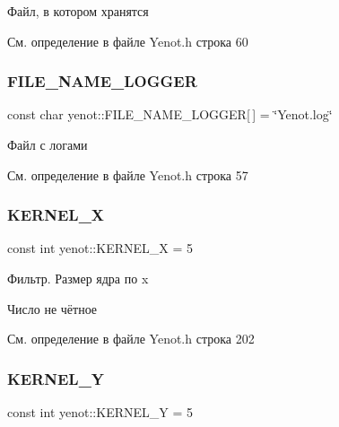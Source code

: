 Файл, в котором хранятся 



См. определение в файле Yenot.\+h строка 60

\mbox{\label{namespaceyenot_a6fdda6751433c679b7976669aff150b8}} 
\subsubsection{\texorpdfstring{F\+I\+L\+E\+\_\+\+N\+A\+M\+E\+\_\+\+L\+O\+G\+G\+ER}{FILE\_NAME\_LOGGER}}
{\footnotesize\ttfamily const char yenot\+::\+F\+I\+L\+E\+\_\+\+N\+A\+M\+E\+\_\+\+L\+O\+G\+G\+ER\mbox{[}$\,$\mbox{]} = \char`\"{}Yenot.\+log\char`\"{}}



Файл с логами 



См. определение в файле Yenot.\+h строка 57

\mbox{\label{namespaceyenot_aa753d0e3e99fb4b37b3930996bdfe563}} 
\subsubsection{\texorpdfstring{K\+E\+R\+N\+E\+L\+\_\+X}{KERNEL\_X}}
{\footnotesize\ttfamily const int yenot\+::\+K\+E\+R\+N\+E\+L\+\_\+X = 5}

Фильтр. Размер ядра по x

Число не чётное 

См. определение в файле Yenot.\+h строка 202

\mbox{\label{namespaceyenot_a33a5af73a30e2b5684ee02cc4bf4c374}} 
\subsubsection{\texorpdfstring{K\+E\+R\+N\+E\+L\+\_\+Y}{KERNEL\_Y}}
{\footnotesize\ttfamily const int yenot\+::\+K\+E\+R\+N\+E\+L\+\_\+Y = 5}

